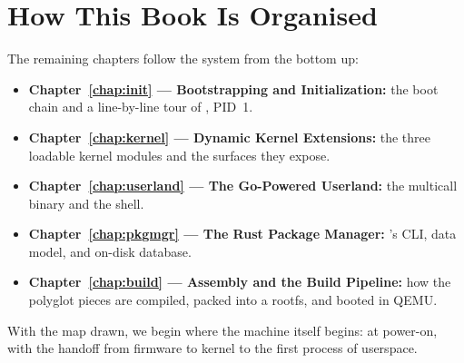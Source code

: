 \section{How This Book Is Organised}

The remaining chapters follow the system from the bottom up:

\begin{itemize}
  \item \textbf{Chapter~\ref{chap:init} --- Bootstrapping and Initialization:}
        the boot chain and a line-by-line tour of , PID~1.
  \item \textbf{Chapter~\ref{chap:kernel} --- Dynamic Kernel Extensions:}
        the three loadable kernel modules and the  surfaces they
        expose.
  \item \textbf{Chapter~\ref{chap:userland} --- The Go-Powered Userland:}
        the  multicall binary and the  shell.
  \item \textbf{Chapter~\ref{chap:pkgmgr} --- The Rust Package Manager:}
        's CLI, data model, and on-disk database.
  \item \textbf{Chapter~\ref{chap:build} --- Assembly and the Build Pipeline:}
        how the polyglot pieces are compiled, packed into a rootfs, and booted
        in QEMU.
\end{itemize}

\noindent
With the map drawn, we begin where the machine itself begins: at power-on, with
the handoff from firmware to kernel to the first process of userspace.
